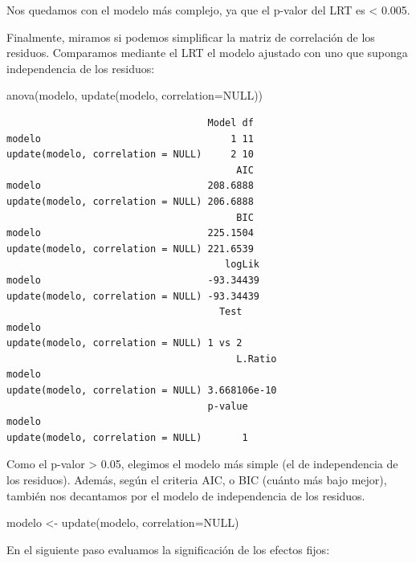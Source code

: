 \documentclass[
]{book}
\newenvironment{Shaded}{\begin{snugshade}}{\end{snugshade}}
\newcommand{\AttributeTok}[1]{\textcolor[rgb]{0.77,0.63,0.00}{#1}}
\newcommand{\ConstantTok}[1]{\textcolor[rgb]{0.00,0.00,0.00}{#1}}
\newcommand{\FunctionTok}[1]{\textcolor[rgb]{0.00,0.00,0.00}{#1}}
\newcommand{\NormalTok}[1]{#1}
\newcommand{\OtherTok}[1]{\textcolor[rgb]{0.56,0.35,0.01}{#1}}
\begin{document}
Nos quedamos con el modelo más complejo, ya que el p-valor del LRT es \textless{} 0.005.

Finalmente, miramos si podemos simplificar la matriz de correlación de los residuos. Comparamos mediante el LRT el modelo ajustado con uno que suponga independencia de los residuos:

\begin{Shaded}
\begin{Highlighting}[]
\FunctionTok{anova}\NormalTok{(modelo, }\FunctionTok{update}\NormalTok{(modelo, }\AttributeTok{correlation=}\ConstantTok{NULL}\NormalTok{))}
\end{Highlighting}
\end{Shaded}

\begin{verbatim}
                                   Model df
modelo                                 1 11
update(modelo, correlation = NULL)     2 10
                                        AIC
modelo                             208.6888
update(modelo, correlation = NULL) 206.6888
                                        BIC
modelo                             225.1504
update(modelo, correlation = NULL) 221.6539
                                      logLik
modelo                             -93.34439
update(modelo, correlation = NULL) -93.34439
                                     Test
modelo                                   
update(modelo, correlation = NULL) 1 vs 2
                                        L.Ratio
modelo                                         
update(modelo, correlation = NULL) 3.668106e-10
                                   p-value
modelo                                    
update(modelo, correlation = NULL)       1
\end{verbatim}

Como el p-valor \textgreater{} 0.05, elegimos el modelo más simple (el de independencia de los residuos). Además, según el criteria AIC, o BIC (cuánto más bajo mejor), también nos decantamos por el modelo de independencia de los residuos.

\begin{Shaded}
\begin{Highlighting}[]
\NormalTok{modelo }\OtherTok{\textless{}{-}} \FunctionTok{update}\NormalTok{(modelo, }\AttributeTok{correlation=}\ConstantTok{NULL}\NormalTok{)}
\end{Highlighting}
\end{Shaded}

En el siguiente paso evaluamos la significación de los efectos fijos:
\end{document}
